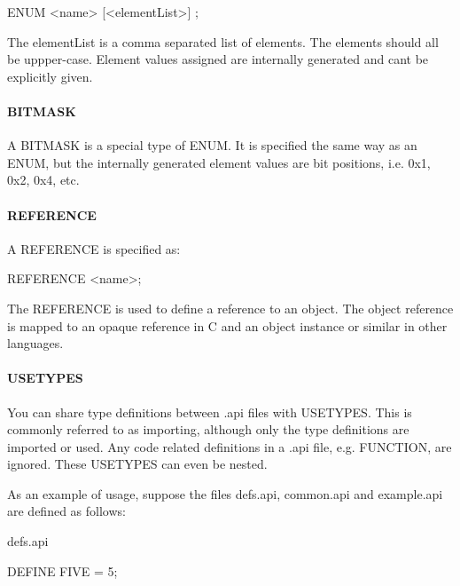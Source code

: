 \begin{DoxyVerb}ENUM <name>
{
    [<elementList>]
};
\end{DoxyVerb}


The {\ttfamily element\+List} is a comma separated list of elements. The elements should all be uppper-\/case. Element values assigned are internally generated and can\textquotesingle{}t be explicitly given.\hypertarget{interface_def_lang_syntax_interfaceDefLangSyntax_typesBitmask}{}\paragraph{B\+I\+T\+M\+A\+S\+K}\label{interface_def_lang_syntax_interfaceDefLangSyntax_typesBitmask}
A B\+I\+T\+M\+A\+S\+K is a special type of E\+N\+U\+M. It is specified the same way as an E\+N\+U\+M, but the internally generated element values are bit positions, i.\+e. 0x1, 0x2, 0x4, etc.\hypertarget{interface_def_lang_syntax_interfaceDefLangSyntax_typesReference}{}\paragraph{R\+E\+F\+E\+R\+E\+N\+C\+E}\label{interface_def_lang_syntax_interfaceDefLangSyntax_typesReference}
A R\+E\+F\+E\+R\+E\+N\+C\+E is specified as\+:

\begin{DoxyVerb}REFERENCE <name>;
\end{DoxyVerb}


The R\+E\+F\+E\+R\+E\+N\+C\+E is used to define a reference to an object. The object reference is mapped to an opaque reference in C and an object instance or similar in other languages.\hypertarget{interface_def_lang_syntax_interfaceDefLangSyntax_typesUsetypes}{}\paragraph{U\+S\+E\+T\+Y\+P\+E\+S}\label{interface_def_lang_syntax_interfaceDefLangSyntax_typesUsetypes}
You can share type definitions between .api files with U\+S\+E\+T\+Y\+P\+E\+S. This is commonly referred to as importing, although only the type definitions are imported or used. Any code related definitions in a .api file, e.\+g. F\+U\+N\+C\+T\+I\+O\+N, are ignored. These U\+S\+E\+T\+Y\+P\+E\+S can even be nested.

As an example of usage, suppose the files defs.\+api, common.\+api and example.\+api are defined as follows\+:

defs.\+api \begin{DoxyVerb}DEFINE FIVE = 5;
\end{DoxyVerb}


